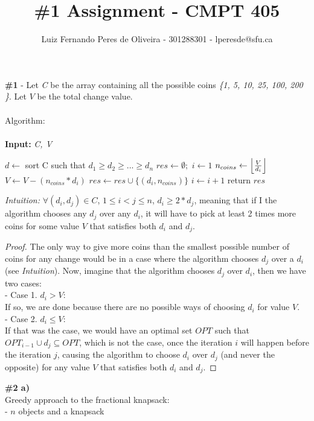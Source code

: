 \documentclass{article}
\title{\#1 Assignment - CMPT 405}
\author{Luiz Fernando Peres de Oliveira - 301288301 - lperesde@sfu.ca}
\newcommand\tab[1][1cm]{\hspace*{#1}}
\DeclarePairedDelimiter\floor{\lfloor}{\rfloor}
\begin{document}
\maketitle

\textbf{\#1} - Let \textit{C} be the array containing all the possible coins \textit{\{1, 5, 10, 25, 100, 200 \}}. Let $V$ be the total change value.\\
\\
Algorithm:\\\\
\textbf{Input:} \textit{C, V}
\begin{algorithmic}
\State $d\gets$ sort C such that $d_1 \geq d_2 \geq ... \geq d_n$
\State $res \gets \emptyset;$  $i \gets 1$
    \State $n_{coins}\gets   \floor*{\frac{V}{d_i}}$
    \State $V \gets V - (n_{coins} * d_i)$
    \State $res \gets res \cup \{ (d_i, n_{coins}) \}$
\EndIf
\State $i \gets i + 1$
\EndWhile
\State return $res$\\
\end{algorithmic}
\textit{Intuition:} $\forall (d_i, d_j) \in C$, $1 \leq i < j \leq n$, $d_i \geq 2*d_j$, meaning that if I the algorithm chooses any $d_j$ over any $d_i$, it will have to pick at least 2 times more coins for some value $V$ that satisfies both $d_i$ and $d_j$.\\
\begin{proof}
The only way to give more coins than the smallest possible number of coins for any change would be in a case where the algorithm chooses $d_j$ over a $d_i$ (see \textit{Intuition}). Now, imagine that the algorithm chooses $d_j$ over $d_i$, then we have two cases:\\
- Case 1. $d_i > V$:\\
\tab If so, we are done because there are no possible ways of choosing $d_i$ for value $V$.\\
- Case 2. $d_i \leq V$:\\
\tab If that was the case, we would have an optimal set $OPT$ such that $OPT_{i-1} \cup d_j \subseteq OPT$, which is not the case, once the iteration $i$ will happen before the iteration $j$, causing the algorithm to choose $d_i$ over $d_j$ (and never the opposite) for any value $V$ that satisfies both $d_i$ and $d_j$.\qedhere
\end{proof}
\textbf{\#2 a)}\\
Greedy approach to the fractional knapsack:\\
- $n$ objects and a knapsack\\
\end{document}
